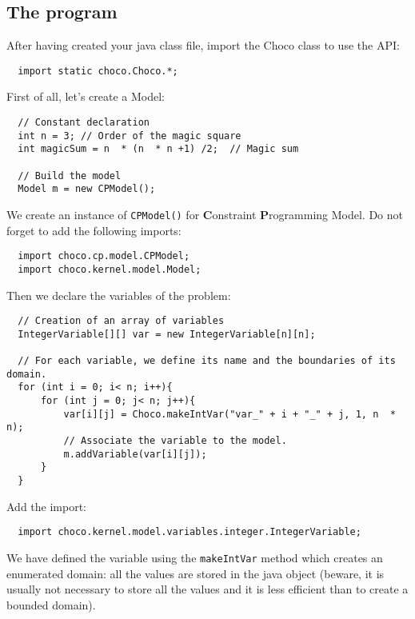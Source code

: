 \subsection{The program}\label{introduction:theprogram}\hypertarget{introduction:theprogram}{}
After having created your java class file, import the Choco class to use the API:
\begin{lstlisting}
  import static choco.Choco.*;
\end{lstlisting}
First of all, let's create a Model:
\begin{lstlisting}
  // Constant declaration
  int n = 3; // Order of the magic square
  int magicSum = n  * (n  * n +1) /2;  // Magic sum
	
  // Build the model
  Model m = new CPModel();
\end{lstlisting}
We create an instance of \texttt{CPModel()} for \textbf{C}onstraint \textbf{P}rogramming Model.
Do not forget to add the following imports:
\begin{lstlisting}
  import choco.cp.model.CPModel;
  import choco.kernel.model.Model;
\end{lstlisting}
Then we declare the variables of the problem:
\begin{lstlisting}
  // Creation of an array of variables
  IntegerVariable[][] var = new IntegerVariable[n][n];
	
  // For each variable, we define its name and the boundaries of its domain.
  for (int i = 0; i< n; i++){
	  for (int j = 0; j< n; j++){
          var[i][j] = Choco.makeIntVar("var_" + i + "_" + j, 1, n  * n);
          // Associate the variable to the model.
          m.addVariable(var[i][j]);
	  }    
  }
\end{lstlisting}
Add the import:
\begin{lstlisting}
  import choco.kernel.model.variables.integer.IntegerVariable;
\end{lstlisting}
We have defined the variable using the \texttt{makeIntVar} method which creates an enumerated domain: all the values are stored in the java object (beware, it is usually not necessary to store all the values and it is less efficient than to create a bounded domain).

